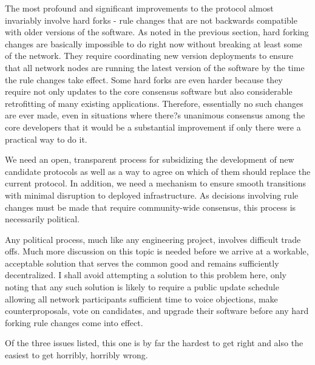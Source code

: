 \documentclass{article}
\begin{document}
The most profound and significant improvements to the protocol almost invariably involve hard forks - rule changes that are not backwards compatible with older versions of the software. As noted in the previous section, hard forking changes are basically impossible to do right now without breaking at least some of the network. They require coordinating new version deployments to ensure that all network nodes are running the latest version of the software by the time the rule changes take effect. Some hard forks are even harder because they require not only updates to the core consensus software but also considerable retrofitting of many existing applications. Therefore, essentially no such changes are ever made, even in situations where there?s unanimous consensus among the core developers that it would be a substantial improvement if only there were a practical way to do it.

We need an open, transparent process for subsidizing the development of new candidate protocols as well as a way to agree on which of them should replace the current protocol. In addition, we need a mechanism to ensure smooth transitions with minimal disruption to deployed infrastructure. As decisions involving rule changes must be made that require community-wide consensus, this process is necessarily political.

Any political process, much like any engineering project, involves difficult trade offs. Much more discussion on this topic is needed before we arrive at a workable, acceptable solution that serves the common good and remains sufficiently decentralized. I shall avoid attempting a solution to this problem here, only noting that any such solution is likely to require a public update schedule allowing all network participants sufficient time to voice objections, make counterproposals, vote on candidates, and upgrade their software before any hard forking rule changes come into effect.

Of the three issues listed, this one is by far the hardest to get right and also the easiest to get horribly, horribly wrong.
\end{document}

